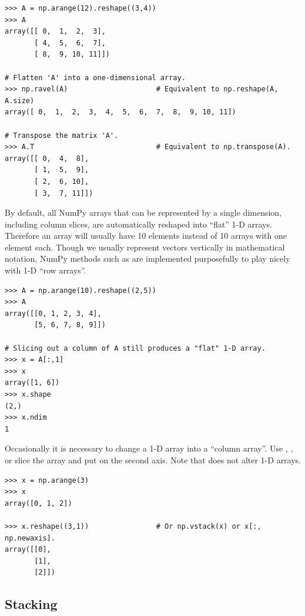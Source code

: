 \begin{lstlisting}
>>> A = np.arange(12).reshape((3,4))
>>> A
array([[ 0,  1,  2,  3],
       [ 4,  5,  6,  7],
       [ 8,  9, 10, 11]])

# Flatten 'A' into a one-dimensional array.
>>> np.ravel(A)                     # Equivalent to np.reshape(A, A.size)
array([ 0,  1,  2,  3,  4,  5,  6,  7,  8,  9, 10, 11])

# Transpose the matrix 'A'.
>>> A.T                             # Equivalent to np.transpose(A).
array([[ 0,  4,  8],
       [ 1,  5,  9],
       [ 2,  6, 10],
       [ 3,  7, 11]])
\end{lstlisting}

\begin{info} %
By default, all NumPy arrays that can be represented by a single dimension, including column slices, are automatically reshaped into ``flat'' 1-D arrays.
Therefore an array will usually have 10 elements instead of 10 arrays with one element each.
Though we usually represent vectors vertically in mathematical notation, NumPy methods such as  are implemented purposefully to play nicely with 1-D ``row arrays''.

\begin{lstlisting}
>>> A = np.arange(10).reshape((2,5))
>>> A
array([[0, 1, 2, 3, 4],
       [5, 6, 7, 8, 9]])

# Slicing out a column of A still produces a "flat" 1-D array.
>>> x = A[:,1]
>>> x
array([1, 6])
>>> x.shape
(2,)
>>> x.ndim
1
\end{lstlisting}

Occasionally it is necessary to change a 1-D array into a ``column array''.
Use , , or slice the array and put  on the second axis.
Note that  does not alter 1-D arrays.

\begin{lstlisting}
>>> x = np.arange(3)
>>> x
array([0, 1, 2])

>>> x.reshape((3,1))                # Or np.vstack(x) or x[:, np.newaxis].
array([[0],
       [1],
       [2]])
\end{lstlisting}
\end{info}

\subsection*{Stacking} %

